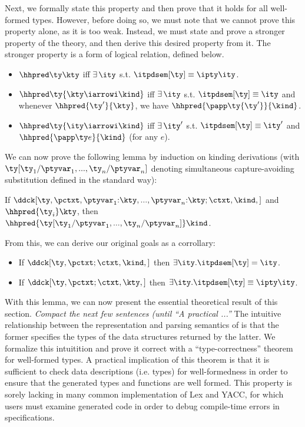 Next, we formally state this property and then prove that it holds for
all well-formed types.  However, before doing so, we must note that we
cannot prove this property alone, as it is too weak. Instead, we must
state and prove a stronger property of the theory, and then derive
this desired property from it.  The stronger property is a form of
logical relation, defined below.

\begin{definition}
\begin{itemize}
\item $\hhpred \ty \kty$ iff $\exists\,\ity$ s.t. $\itpdsem[\ty] \equiv
  {\ipty \ity}$.
\item $\hhpred \ty {\kty \iarrowi \kind}$ iff $\exists\,\ity$
  s.t. $\itpdsem[\ty] \equiv \ity$ and whenever $\hhpred
  {\ty'}{\kty}$, we have $\hhpred {\papp \ty {\ty'}}{\kind}$.
\item $\hhpred \ty {\ity \iarrowi \kind}$ iff $\exists\,\ity'$
  s.t. $\itpdsem[\ty] \equiv \ity'$ and $\hhpred{\papp \ty e}{\kind}$ (for any $e$).
\end{itemize}
\end{definition}

We can now prove the following lemma by induction on kinding derivations
(with $\ty[\ty_1/\ptyvar_1,...,\ty_n/\ptyvar_n]$ denoting simultaneous
capture-avoiding substitution defined in the standard way):
\begin{lemma}
   If
   $\ddck[\ty,{\pctxt,\ptyvar_1{:}\kty,...,\ptyvar_n{:}\kty;\ctxt},\kind,{}]$ 
   and $\hhpred {\ty_i} \kty$, then \\ 
   $\hhpred {\ty[\ty_1/\ptyvar_1,...,\ty_n/\ptyvar_n]} \kind$.
\end{lemma}

From this, we can derive our original goals as a corrollary:
\begin{lemma}
  \begin{itemize}
  \item If $\ddck[\ty,\pctxt;\ctxt,\kind,{}]$ then $\exists
     \ity.\itpdsem[\ty] = \ity$.
   \item If $\ddck[\ty,\pctxt;\ctxt,\kty,{}]$ then $\exists
     \ity.\itpdsem[\ty] \equiv \ipty \ity$.
  \end{itemize}
\end{lemma}

With this lemma, we can now present the essential theoretical result
of this section. \emph{Compact the next few sentences (until ``A
  practical ...''}
The intuitive relationship between the representation
and parsing semantics of \ddc{} is that the former specifies the types
of the data structures returned by the latter. We formalize this
intuitition and prove it correct with a ``type-correctness'' theorem
for well-formed types. A practical implication of this theorem is that
it is sufficient to check data descriptions (i.e. \ddc{} types) for
well-formedness in order to ensure that the generated types and
functions are well formed. This property is sorely lacking in many
common implementation of Lex and YACC, for which users must examine
generated code in order to debug compile-time errors in
specifications.

